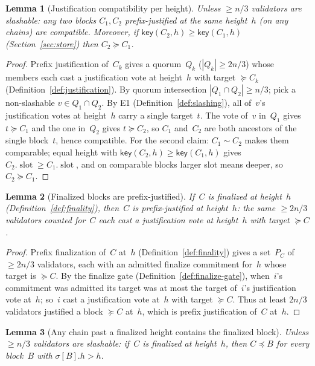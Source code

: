 \ifx\litemode\undefined\documentclass{article}\fi
\newcommand{\slot}[0]{\ensuremath{\operatorname{\mathrm{slot}}}}
\newcommand{\key}{\ensuremath{\mathsf{key}}}
\theoremstyle{plain}
\newtheorem{lemma}{Lemma}
\theoremstyle{definition}
\theoremstyle{remark}
\begin{document}
\begin{lemma}[Justification compatibility per height]\label{lem:just-compat}
Unless $\geq n/3$ validators are slashable: any two blocks $C_1, C_2$ prefix-justified at the same height~$h$ (on any chains) are compatible.
Moreover, if $\key(C_2, h) \geq \key(C_1, h)$ (Section~\ref{sec:store}) then $C_2 \succeq C_1$.
\end{lemma}

\begin{proof}
Prefix justification of~$C_k$ gives a quorum~$Q_k$ ($|Q_k| \geq 2n/3$) whose members each cast a justification vote at height~$h$ with target $\succeq C_k$ (Definition~\ref{def:justification}).
By quorum intersection $|Q_1 \cap Q_2| \geq n/3$; pick a non-slashable $v \in Q_1 \cap Q_2$.
By E1 (Definition~\ref{def:slashing}), all of~$v$'s justification votes at height~$h$ carry a single target~$t$.
The vote of~$v$ in~$Q_1$ gives $t \succeq C_1$ and the one in~$Q_2$ gives $t \succeq C_2$, so $C_1$ and~$C_2$ are both ancestors of the single block~$t$, hence compatible.
For the second claim: $C_1 \sim C_2$ makes them comparable; equal height with $\key(C_2, h) \geq \key(C_1, h)$ gives $C_2.\slot \geq C_1.\slot$, and on comparable blocks larger slot means deeper, so $C_2 \succeq C_1$.
\end{proof}

\begin{lemma}[Finalized blocks are prefix-justified]\label{lem:fin-just}
If~$C$ is finalized at height~$h$ (Definition~\ref{def:finality}), then~$C$ is prefix-justified at height~$h$: the same $\geq 2n/3$ validators counted for~$C$ each cast a justification vote at height~$h$ with target $\succeq C$.
\end{lemma}

\begin{proof}
Prefix finalization of~$C$ at~$h$ (Definition~\ref{def:finality}) gives a set~$P_C$ of $\geq 2n/3$ validators, each with an admitted finalize commitment for~$h$ whose target is $\succeq C$.
By the finalize gate (Definition~\ref{def:finalize-gate}), when~$i$'s commitment was admitted its target was at most the target of~$i$'s justification vote at~$h$; so~$i$ cast a justification vote at~$h$ with target $\succeq C$.
Thus at least $2n/3$ validators justified a block $\succeq C$ at~$h$, which is prefix justification of~$C$ at~$h$.
\end{proof}

\begin{lemma}[Any chain past a finalized height contains the finalized block]\label{lem:mainsafety}
Unless $\geq n/3$ validators are slashable: if~$C$ is finalized at height~$h$, then $C \preceq B$ for every block~$B$ with $\sigma[B].h > h$.
\end{lemma}
\end{document}
